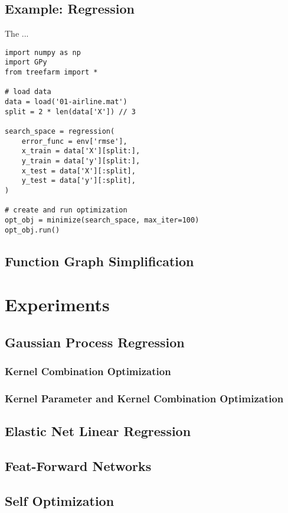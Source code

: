 \documentclass[english]{article}
\begin{document}
\subsection{Example: Regression}
The ...

\begin{verbatim}
import numpy as np
import GPy
from treefarm import *

# load data
data = load('01-airline.mat')
split = 2 * len(data['X']) // 3

search_space = regression(
    error_func = env['rmse'],
    x_train = data['X'][split:],
    y_train = data['y'][split:],
    x_test = data['X'][:split],
    y_test = data['y'][:split],
)

# create and run optimization
opt_obj = minimize(search_space, max_iter=100)
opt_obj.run()

\end{verbatim}


\subsection{Function Graph Simplification}

\section{Experiments}


\subsection{Gaussian Process Regression}
\subsubsection{Kernel Combination Optimization}
\subsubsection{Kernel Parameter and Kernel Combination Optimization}
\subsection{Elastic Net Linear Regression}
\subsection{Feat-Forward Networks}
\subsection{Self Optimization}
\end{document}
